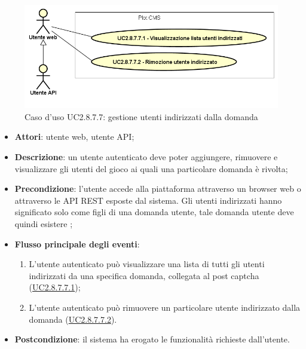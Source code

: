         \begin{figure}[H]
            \centering
            \includegraphics[scale=0.45, width=\textwidth]{immagini/usecase/UC2-8-7-7.png}
            \caption{Caso d'uso UC2.8.7.7: gestione utenti indirizzati dalla domanda}\label{fig:UC2.8.7.7} 
        \end{figure}
\begin{itemize}
\item \textbf{Attori}: utente web, utente API;
\item \textbf{Descrizione}: un utente autenticato deve poter aggiungere, rimuovere e visualizzare gli utenti del gioco ai quali una particolare domanda è rivolta; 
      \item \textbf{Precondizione}: l'utente accede alla piattaforma attraverso un browser web o attraverso le API REST esposte dal sistema. Gli utenti indirizzati hanno significato solo come figli di una domanda utente, tale domanda utente deve quindi esistere ;

        \item \textbf{Flusso principale degli eventi}:
          \begin{enumerate}
          \item L'utente autenticato può visualizzare una lista di tutti gli utenti indirizzati da una specifica domanda, collegata al post captcha (\hyperlink{UC2.8.7.7.1}{UC2.8.7.7.1});
          \item L'utente autenticato può rimuovere un particolare utente indirizzato dalla domanda (\hyperlink{UC2.8.7.7.2}{UC2.8.7.7.2}).

      \end{enumerate}
    \item \textbf{Postcondizione}: il sistema ha erogato le funzionalità richieste dall'utente.
  \end{itemize}
\hypertarget{UC2.8.7.7.1}{}
